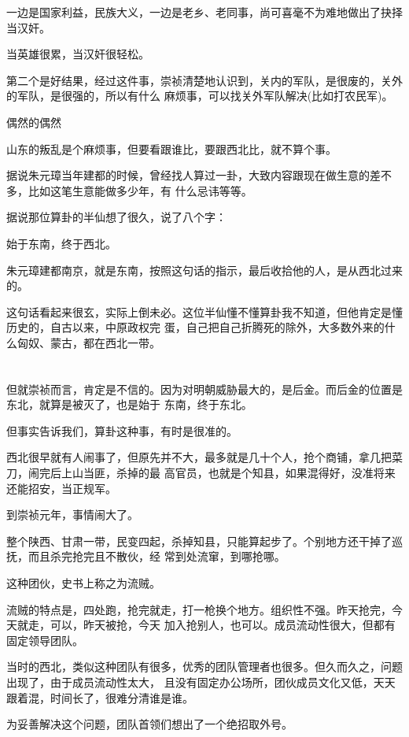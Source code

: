 \documentclass[11pt,a4paper,onecolumn]{article}
\begin{document}
一边是国家利益，民族大义，一边是老乡、老同事，尚可喜毫不为难地做出了抉择\myrule 当汉奸。

当英雄很累，当汉奸很轻松。

第二个是好结果，经过这件事，崇祯清楚地认识到，关内的军队，是很废的，关外的军队，是很强的，所以有什么
麻烦事，可以找关外军队解决(比如打农民军)。

偶然的偶然

山东的叛乱是个麻烦事，但要看跟谁比，要跟西北比，就不算个事。

据说朱元璋当年建都的时候，曾经找人算过一卦，大致内容跟现在做生意的差不多，比如这笔生意能做多少年，有
什么忌讳等等。

据说那位算卦的半仙想了很久，说了八个字：

始于东南，终于西北。

朱元璋建都南京，就是东南，按照这句话的指示，最后收拾他的人，是从西北过来的。

这句话看起来很玄，实际上倒未必。这位半仙懂不懂算卦我不知道，但他肯定是懂历史的，自古以来，中原政权完
蛋，自己把自己折腾死的除外，大多数外来的什么匈奴、蒙古，都在西北一带。

\section[\thesection]{}

但就崇祯而言，肯定是不信的。因为对明朝威胁最大的，是后金。而后金的位置是东北，就算是被灭了，也是始于
东南，终于东北。

但事实告诉我们，算卦这种事，有时是很准的。

西北很早就有人闹事了，但原先并不大，最多就是几十个人，抢个商铺，拿几把菜刀，闹完后上山当匪，杀掉的最
高官员，也就是个知县，如果混得好，没准将来还能招安，当正规军。

到崇祯元年，事情闹大了。

整个陕西、甘肃一带，民变四起，杀掉知县，只能算起步了。个别地方还干掉了巡抚，而且杀完抢完且不散伙，经
常到处流窜，到哪抢哪。

这种团伙，史书上称之为流贼。

流贼的特点是，四处跑，抢完就走，打一枪换个地方。组织性不强。昨天抢完，今天就走，可以，昨天被抢，今天
加入抢别人，也可以。成员流动性很大，但都有固定领导团队。

当时的西北，类似这种团队有很多，优秀的团队管理者也很多。但久而久之，问题出现了，由于成员流动性太大，
且没有固定办公场所，团伙成员文化又低，天天跟着混，时间长了，很难分清谁是谁。

为妥善解决这个问题，团队首领们想出了一个绝招\myrule 取外号。
\end{document}
